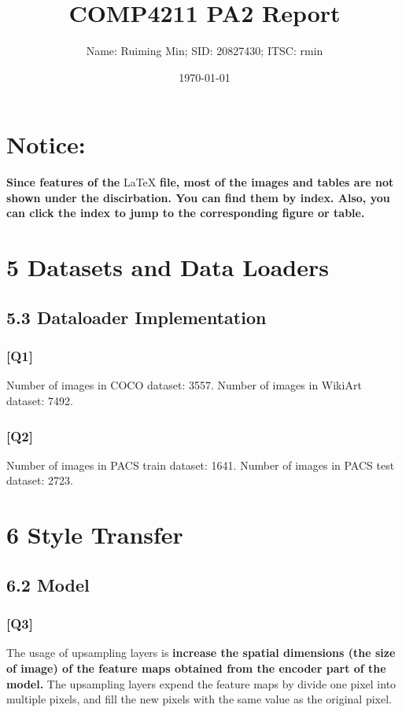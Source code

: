 \documentclass{article}
\title{COMP4211 PA2 Report}
\author{Name: Ruiming Min; SID: 20827430; ITSC: rmin}
\date{\today}
\begin{document}
    
\maketitle

\section*{Notice:}
\textbf{Since features of the} \LaTeX \textbf{ file, most of the images and tables are not shown under the discirbation. You can find them by index. Also, you can click the index to jump to the corresponding figure or table.}

\section*{5 Datasets and Data Loaders}

\subsection*{5.3 Dataloader Implementation}

\subsubsection*{[Q1]}
Number of images in COCO dataset: 3557.
Number of images in WikiArt dataset: 7492.

\subsubsection*{[Q2]}
Number of images in PACS train dataset: 1641.
Number of images in PACS test dataset: 2723.

\newpage

\section*{6 Style Transfer}

\subsection*{6.2 Model}

\subsubsection*{[Q3]}
The usage of upsampling layers is \textbf{increase the spatial dimensions (the size of image) of the feature maps obtained from the encoder part of the model.} 
The upsampling layers expend the feature maps by divide one pixel into multiple pixels, and fill the new pixels with the same value as the original pixel.
\end{document}
